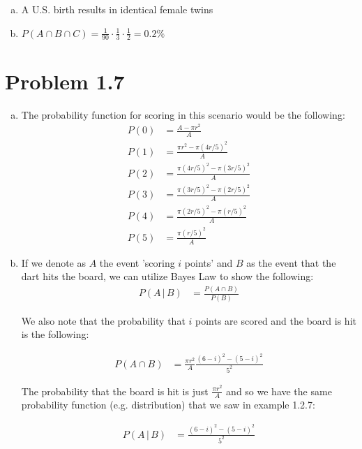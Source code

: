 \documentclass[11pt]{article}
\begin{document}
\begin{enumerate}[(a)]
    \item A U.S. birth results in identical female twins
    \item $P(A \cap B \cap C) = \frac{1}{90} \cdot \frac{1}{3} \cdot \frac{1}{2} = 0.2\%$
\end{enumerate}

\section*{Problem 1.7}

\begin{enumerate}[(a)]
    \item The probability function for scoring in this scenario would be the following:
        \begin{align*}
            P(0) &= \frac{A - \pi r^2}{A} \\
            P(1) &= \frac{\pi r^2 - \pi (4r/5)^2}{A} \\
            P(2) &= \frac{\pi (4r/5)^2 - \pi (3r/5)^2}{A} \\
            P(3) &= \frac{\pi (3r/5)^2 - \pi (2r/5)^2}{A} \\
            P(4) &= \frac{\pi (2r/5)^2 - \pi (r/5)^2}{A} \\
            P(5) &= \frac{\pi (r/5)^2}{A}
        \end{align*}
    \item If we denote as $A$ the event 'scoring $i$ points' and $B$ as the event that the dart hits the board, we can utilize Bayes Law to show the following:
        \begin{align*}
            P(A \, | \, B) &= \frac{P(A \cap B)}{P(B)}
        \end{align*}
        
        We also note that the probability that $i$ points are scored and the board is hit is the following:
        
        \begin{align*}
            P(A \cap B) &= \frac{\pi r^2}{A} \frac{(6-i)^2 - (5-i)^2}{5^2}
        \end{align*}
        
        The probability that the board is hit is just $\frac{\pi r^2}{A}$ and so we have the same probability function (e.g. distribution) that we saw in example 1.2.7:
        
        \begin{align*}
            P(A \, | \, B) &= \frac{(6-i)^2 - (5-i)^2}{5^2}
        \end{align*}
\end{enumerate}
\end{document}

